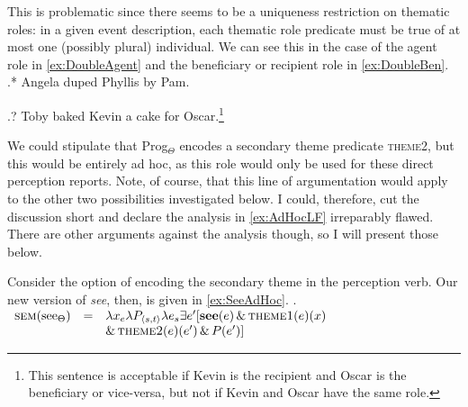 \documentclass[MilwayThesis]{subfiles}
\begin{document}
This is problematic since there seems to be a uniqueness restriction on thematic roles: in a given event description, each thematic role predicate must be true of at most one (possibly plural) individual.
We can see this in the case of the agent role in \cref{ex:DoubleAgent} and the beneficiary or recipient role in \cref{ex:DoubleBen}.
\ex.* \label{ex:DoubleAgent} Angela duped Phyllis by Pam.

\ex.? \label{ex:DoubleBen} Toby baked Kevin a cake for Oscar.\footnote{
	This sentence is acceptable if Kevin is the recipient and Oscar is the beneficiary or vice-versa, but not if Kevin and Oscar have the same role.
}

We could stipulate that Prog$_{\Theta}$ encodes a secondary theme predicate \textsc{theme2}, but this would be entirely ad hoc, as this role would only be used for these direct perception reports.
Note, of course, that this line of argumentation would apply to the other two possibilities investigated below.
I could, therefore, cut the discussion short and declare the analysis in \cref{ex:AdHocLF} irreparably flawed.
There are other arguments against the analysis though, so I will present those below.

Consider the option of encoding the secondary theme in the perception verb.
Our new version of \textit{see}, then, is given in \cref{ex:SeeAdHoc}.
\ex.\label{ex:SeeAdHoc}
$
\begin{array}[t]{rcl}
	\textsc{sem}(\text{see}_\Theta) & = & \lambda x_e \lambda P_{\langle s,t\rangle} \lambda e_{s} \exists e^{\prime} [\textbf{see}(e) \,\&\, \textsc{theme1}(e)(x) \\
		& & \&\, \textsc{theme2}(e)(e^{\prime}) \,\&\, P(e^{\prime})]
\end{array}
$
\end{document}
